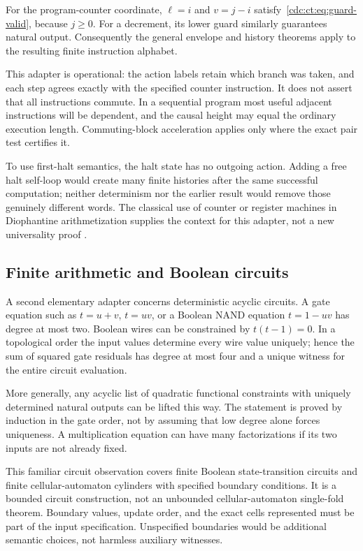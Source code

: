 \documentclass[11pt,a4paper]{article}
\theoremstyle{definition}
\theoremstyle{remark}
\begin{document}
For the program-counter coordinate, $\ell=i$ and $v=j-i$ satisfy~\eqref{cdc:ct:eq:guard-valid}, because $j\ge0$. For a decrement, its lower guard similarly guarantees natural output. Consequently the general envelope and history theorems apply to the resulting finite instruction alphabet.

This adapter is operational: the action labels retain which branch was taken, and each step agrees exactly with the specified counter instruction. It does not assert that all instructions commute. In a sequential program most useful adjacent instructions will be dependent, and the causal height may equal the ordinary execution length. Commuting-block acceleration applies only where the exact pair test certifies it.

To use first-halt semantics, the halt state has no outgoing action. Adding a free halt self-loop would create many finite histories after the same successful computation; neither determinism nor the earlier result would remove those genuinely different words. The classical use of counter or register machines in Diophantine arithmetization supplies the context for this adapter, not a new universality proof \cite{jm1984,lf2022}.

\subsection{Finite arithmetic and Boolean circuits}
A second elementary adapter concerns deterministic acyclic circuits. A gate equation such as $t=u+v$, $t=uv$, or a Boolean NAND equation $t=1-uv$ has degree at most two. Boolean wires can be constrained by $t(t-1)=0$. In a topological order the input values determine every wire value uniquely; hence the sum of squared gate residuals has degree at most four and a unique witness for the entire circuit evaluation.

More generally, any acyclic list of quadratic functional constraints with uniquely determined natural outputs can be lifted this way. The statement is proved by induction in the gate order, not by assuming that low degree alone forces uniqueness. A multiplication equation can have many factorizations if its two inputs are not already fixed.

This familiar circuit observation covers finite Boolean state-transition circuits and finite cellular-automaton cylinders with specified boundary conditions. It is a bounded circuit construction, not an unbounded cellular-automaton single-fold theorem. Boundary values, update order, and the exact cells represented must be part of the input specification. Unspecified boundaries would be additional semantic choices, not harmless auxiliary witnesses.
\end{document}
